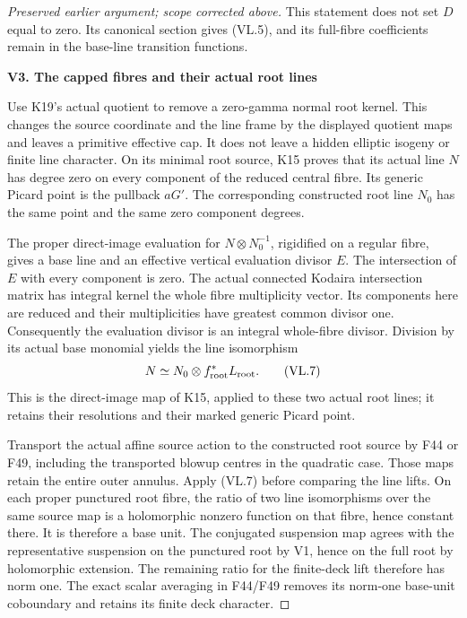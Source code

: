 \begin{proof}[Preserved earlier argument; scope corrected above]
This statement does not set \(D\) equal to zero. Its
canonical section gives (VL.5), and its full-fibre
coefficients remain in the base-line transition functions.

\par

\medskip\noindent\textbf{V3. The capped fibres and their actual root lines}

\par\nobreak

Use K19's actual quotient to remove a zero-gamma normal
root kernel. This changes the source coordinate and the
line frame by the displayed quotient maps and leaves a
primitive effective cap. It does not leave a hidden
elliptic isogeny or finite line character. On its minimal
root source, K15 proves that its actual line \(N\) has
degree zero on every component of the reduced central
fibre. Its generic Picard point is the pullback \(aG'\).
The corresponding constructed root line \(N_0\) has
the same point and the same zero component degrees.

The proper direct-image evaluation for
\(N\otimes N_0^{-1}\), rigidified on a regular fibre,
gives a base line and an effective vertical evaluation
divisor \(E\). The intersection of \(E\) with every
component is zero. The actual connected Kodaira
intersection matrix has integral kernel the whole
fibre multiplicity vector. Its components here are
reduced and their multiplicities have greatest common
divisor one. Consequently the evaluation divisor is
an integral whole-fibre divisor. Division by its
actual base monomial yields the line isomorphism
\[
             N\simeq N_0\otimes f_{\rm root}^*L_{\rm root}.
 \tag{VL.7}
\]
This is the direct-image map of K15, applied to these
two actual root lines; it retains their resolutions
and their marked generic Picard point.

Transport the actual affine source action to the
constructed root source by F44 or F49, including the
transported blowup centres in the quadratic case.
Those maps retain the entire outer annulus. Apply
(VL.7) before comparing the line lifts. On each
proper punctured root fibre, the ratio of two line
isomorphisms over the same source map is a
holomorphic nonzero function on that fibre, hence
constant there. It is therefore a base unit.
The conjugated suspension map agrees with the
representative suspension on the punctured root by
V1, hence on the full root by holomorphic extension.
The remaining ratio for the finite-deck lift
therefore has norm one.
The exact scalar averaging in F44/F49 removes its
norm-one base-unit coboundary and retains its finite
deck character.


\end{proof}
